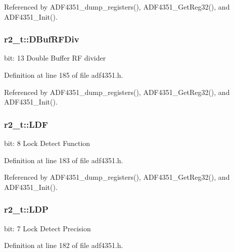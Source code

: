 Referenced by A\+D\+F4351\+\_\+dump\+\_\+registers(), A\+D\+F4351\+\_\+\+Get\+Reg32(), and A\+D\+F4351\+\_\+\+Init().

\subsubsection[{\texorpdfstring{D\+Buf\+R\+F\+Div}{DBufRFDiv}}]{ r2\+\_\+t\+::\+D\+Buf\+R\+F\+Div}\hypertarget{structr2__t_a14726d1cf923d8e12279cd3038fa0540}{}\label{structr2__t_a14726d1cf923d8e12279cd3038fa0540}
bit\+: 13 Double Buffer RF divider 

Definition at line 185 of file adf4351.\+h.



Referenced by A\+D\+F4351\+\_\+dump\+\_\+registers(), A\+D\+F4351\+\_\+\+Get\+Reg32(), and A\+D\+F4351\+\_\+\+Init().

\subsubsection[{\texorpdfstring{L\+DF}{LDF}}]{ r2\+\_\+t\+::\+L\+DF}\hypertarget{structr2__t_a42f019ff5be1600c098175eb64ab55da}{}\label{structr2__t_a42f019ff5be1600c098175eb64ab55da}
bit\+: 8 Lock Detect Function 

Definition at line 183 of file adf4351.\+h.



Referenced by A\+D\+F4351\+\_\+dump\+\_\+registers(), A\+D\+F4351\+\_\+\+Get\+Reg32(), and A\+D\+F4351\+\_\+\+Init().

\subsubsection[{\texorpdfstring{L\+DP}{LDP}}]{ r2\+\_\+t\+::\+L\+DP}\hypertarget{structr2__t_a406cd49f63cb56882de02e7fe2ace6bf}{}\label{structr2__t_a406cd49f63cb56882de02e7fe2ace6bf}
bit\+: 7 Lock Detect Precision 

Definition at line 182 of file adf4351.\+h.



